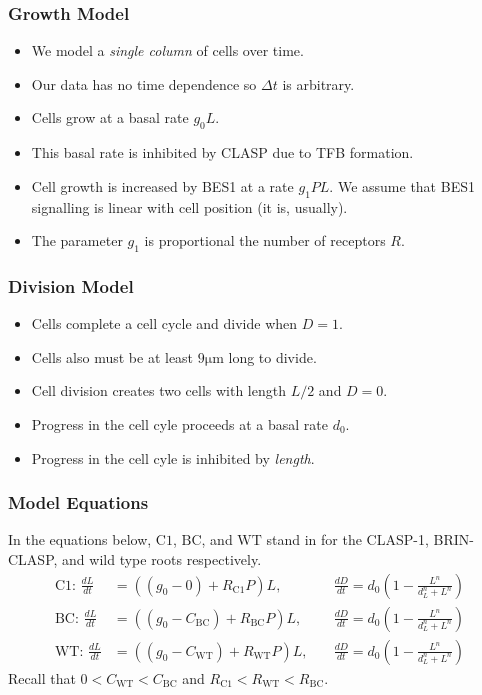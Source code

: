 \documentclass{beamer}
\newcommand{\um}{\unit{\micro\metre}}
\begin{document}
\begin{frame}
\frametitle{Growth Model}
\begin{itemize}
    \setlength\itemsep{0.8em}
    \item We model a \emph{single column} of cells over time.
    \item Our data has no time dependence so $\Delta t$ is arbitrary.
    \item Cells grow at a basal rate $g_{0}L$. 
    \item This basal rate is inhibited by CLASP due to TFB formation.
    \item Cell growth is increased by BES1 at a rate $g_{1}PL$. We assume that BES1 signalling is linear with cell position (it is, usually).
    \item The parameter $g_{1}$ is proportional the number of receptors $R$.
\end{itemize}
\end{frame}

\begin{frame}
\frametitle{Division Model}
\begin{itemize}
    \setlength\itemsep{0.8em}
    \item Cells complete a cell cycle and divide when $D=1$.
    \item Cells also must be at least $9\um$ long to divide.
    \item Cell division creates two cells with length $L / 2$ and $D = 0$.
    \item Progress in the cell cyle proceeds at a basal rate $d_{0}$.
    \item Progress in the cell cyle is inhibited by \emph{length}. 
\end{itemize}
\medskip
\end{frame}


\begin{frame}
\frametitle{Model Equations}
In the equations below, $\text{C1}$, $\text{BC}$, and $\text{WT}$ stand in for the  CLASP-1, BRIN-CLASP, and wild type roots respectively.
$$
\begin{aligned}
    \text{C1: }\frac{ dL }{ dt } &= \left( (g_{0} - 0) + R_{\text{C1}}P  \right)L, \quad &\frac{ dD }{ dt } = d_{0}\left(1 - \frac{ L^{ n } }{ d_{L}^{ n } + L^{ n } }\right) \\[5pt]
    \text{BC: }\frac{ dL }{ dt } &= \left( (g_{0} - C_{\text{BC}}) +  R_{\text{BC}}P \right)L, \quad &\frac{ dD }{ dt } = d_{0}\left(1 - \frac{ L^{ n } }{ d_{L}^{ n } + L^{ n } }\right) \\[5pt]
    \text{WT: }\frac{ dL }{ dt } &= \left((g_{0} - C_{\text{WT}}) + R_{\text{WT}}P\right)L, \quad &\frac{ dD }{ dt } = d_{0}\left(1 - \frac{ L^{ n } }{ d_{L}^{ n } + L^{ n } }\right)
\end{aligned}
$$
Recall that $0 < C_{\text{WT}} < C_{\text{BC}}$ and $R_{\text{C1}} < R_{\text{WT}} < R_{\text{BC}}$.
\end{frame}
\end{document}
